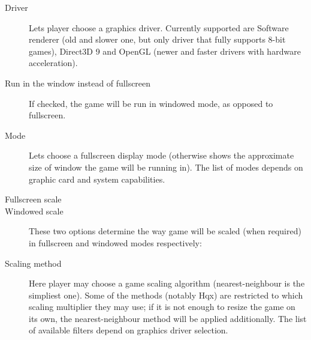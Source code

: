 \begin{description}
\item [Driver]
  Lets player choose a graphics driver. Currently supported are Software renderer (old and slower one, but only driver that fully supports 8-bit games),
Direct3D 9 and OpenGL (newer and faster drivers with hardware acceleration).
\item [Run in the window instead of fullscreen]
  If checked, the game will be run in windowed mode, as opposed to fullscreen.
\item [Mode]
  Lets choose a fullscreen display mode (otherwise shows the approximate size of
window the game will be running in). The list of modes depends on graphic card and
system capabilities.
\item [Fullscreen scale]
\item [Windowed scale]
  These two options determine the way game will be scaled (when required) in fullscreen and windowed modes respectively:
\item [Scaling method]
  Here player may choose a game scaling algorithm (nearest-neighbour is the simpliest one). Some of the methods
  (notably Hqx) are restricted to which scaling multiplier they may use; if it is not
  enough to resize the game on its own, the nearest-neighbour method will be applied additionally.
  The list of available filters depend on graphics driver selection.
\end{description}

